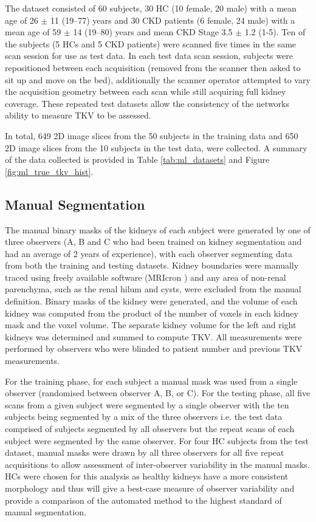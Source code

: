 \newpage
The dataset consisted of 60 subjects, 30 \ac{HC} (10 female, 20 male) with a mean age of 26 $\pm$ 11 (19–77) years and 30 \ac{CKD} patients (6 female, 24 male) with a mean age of 59 $\pm$ 14 (19–80) years and mean \ac{CKD} Stage 3.5 $\pm$ 1.2 (1-5). Ten of the subjects (5 \ac{HC}s and 5 \ac{CKD} patients) were scanned five times in the same scan session for use as test data. In each test data scan session, subjects were repositioned between each acquisition (removed from the scanner then asked to sit up and move on the bed), additionally the scanner operator attempted to vary the acquisition geometry between each scan while still acquiring full kidney coverage. These repeated test datasets allow the consistency of the networks ability to measure \ac{TKV} to be assessed. 

In total, 649 2D image slices from the 50 subjects in the training data and 650 2D image slices from the 10 subjects in the test data, were collected. A summary of the data collected is provided in Table \ref{tab:ml_datasets} and Figure \ref{fig:ml_true_tkv_hist}.

\subsection{Manual Segmentation}
The manual binary masks of the kidneys of each subject were generated by one of three observers (A, B and C who had been trained on kidney segmentation and had an average of 2 years of experience), with each observer segmenting data from both the training and testing datasets. Kidney boundaries were manually traced using freely available software (MRIcron \cite{rorden_neurolabuscmricron_2021}) and any area of non-renal parenchyma, such as the renal hilum and cysts, were excluded from the manual definition. Binary masks of the kidney were generated, and the volume of each kidney was computed from the product of the number of voxels in each kidney mask and the voxel volume. The separate kidney volume for the left and right kidneys was determined and summed to compute \ac{TKV}. All measurements were performed by observers who were blinded to patient number and previous \ac{TKV} measurements. 

For the training phase, for each subject a manual mask was used from a single observer (randomised between observer A, B, or C). For the testing phase, all five scans from a given subject were segmented by a single observer with the ten subjects being segmented by a mix of the three observers i.e. the test data comprised of subjects segmented by all observers but the repeat scans of each subject were segmented by the same observer. For four \ac{HC} subjects from the test dataset, manual masks were drawn by all three observers for all five repeat acquisitions to allow assessment of inter-observer variability in the manual masks. \ac{HC}s were chosen for this analysis as healthy kidneys have a more consistent morphology and thus will give a best-case measure of observer variability and provide a comparison of the automated method to the highest standard of manual segmentation.

